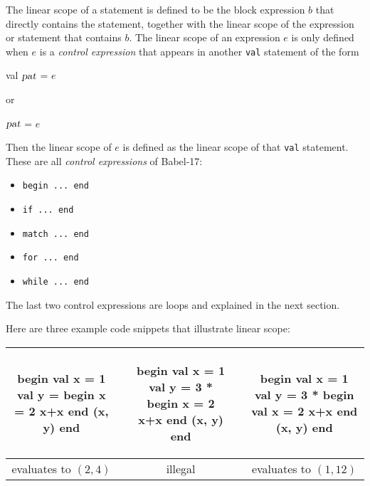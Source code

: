 \documentclass[11pt]{amsart}
\newcommand{\metababel}[1] {\textsl{#1}}
\newcommand{\babelsrc}[1] {\lstinline!#1!}
\begin{document}
The linear scope of a statement is defined to be the block expression $b$ that directly contains the statement, together with the linear scope of the expression or statement that contains $b$. 
The linear scope of an expression $e$ is only defined when $e$ is a \emph{control expression} that appears in another \babelsrc{val} statement of the form
\begin{babellisting}
val $\metababel{pat}$ = $e$
\end{babellisting}
or
\begin{babellisting}
$\metababel{pat}$ = $e$
\end{babellisting}
Then the linear scope of $e$ is defined as the linear scope of that \babelsrc{val} statement.
These are all \emph{control expressions} of Babel-17:
\begin{itemize}
\item \babelsrc{begin ... end}
\item \babelsrc{if ... end}
\item \babelsrc{match ... end}
\item \babelsrc{for ... end}
\item \babelsrc{while ... end}
\end{itemize}
The last two control expressions are loops and explained in the next section.

Here are three example code snippets that illustrate linear scope:
\begin{center}
\begin{tabular}{ccccc}
\begin{babellisting}
begin
  val x = 1
  val y = 
    begin 
      x = 2 
      x+x 
    end
  (x, y)
end
\end{babellisting}
& \hspace{1cm} &
\begin{babellisting}
begin
  val x = 1
  val y = 3 *
    begin 
      x = 2 
      x+x 
    end
  (x, y)
end
\end{babellisting}
& \hspace{1cm} &
\begin{babellisting}
begin
  val x = 1
  val y = 3 *
    begin 
      val x = 2 
      x+x 
    end
  (x, y)
end
\end{babellisting}\\\hline
evaluates to $(2, 4)$ & &
illegal & &
evaluates to $(1, 12)$ \\[0.5cm]
\end{tabular}
\end{center}
\end{document}
